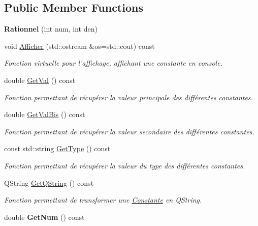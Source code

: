 \subsection*{Public Member Functions}
\begin{DoxyCompactItemize}
\item 
\hypertarget{class_rationnel_afac9e543020a4611f5c217a01f3c0a7e}{{\bfseries Rationnel} (int num, int den)}\label{class_rationnel_afac9e543020a4611f5c217a01f3c0a7e}

\item 
void \hyperlink{class_rationnel_a52b4a6398d50e630ad76be8be0185f9f}{Afficher} (std\-::ostream \&os=std\-::cout) const 
\begin{DoxyCompactList}\small\item\em Fonction virtuelle pour l'affichage, affichant une constante en console. \end{DoxyCompactList}\item 
double \hyperlink{class_rationnel_a29987744cb2a7631ffa4db708630fe19}{Get\-Val} () const 
\begin{DoxyCompactList}\small\item\em Fonction permettant de récupérer la valeur principale des différentes constantes. \end{DoxyCompactList}\item 
double \hyperlink{class_rationnel_a2403f411e88b3de9f83ad735342e68ec}{Get\-Val\-Bis} () const 
\begin{DoxyCompactList}\small\item\em Fonction permettant de récupérer la valeur secondaire des différentes constantes. \end{DoxyCompactList}\item 
const std\-::string \hyperlink{class_rationnel_a8c04071cda8dbe6f2b13db3e48d1bedb}{Get\-Type} () const 
\begin{DoxyCompactList}\small\item\em Fonction permettant de récupérer la valeur du type des différentes constantes. \end{DoxyCompactList}\item 
Q\-String \hyperlink{class_rationnel_af3d40b73dc2dd7ca6e978fe5ddb0c945}{Get\-Q\-String} () const 
\begin{DoxyCompactList}\small\item\em Fonction permettant de transformer une \hyperlink{class_constante}{Constante} en Q\-String. \end{DoxyCompactList}\item 
\hypertarget{class_rationnel_a07ba81e61e4186ada00f3da12bb24ffc}{double {\bfseries Get\-Num} () const }\label{class_rationnel_a07ba81e61e4186ada00f3da12bb24ffc}


\end{DoxyCompactItemize}
